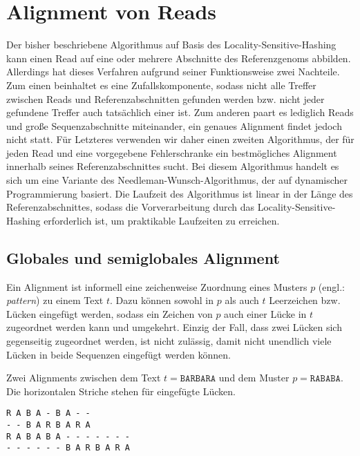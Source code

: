 \chapter{Alignment von Reads}
\label{sec:align}

Der bisher beschriebene Algorithmus auf Basis des Locality-Sensitive-Hashing kann einen Read auf eine oder mehrere Abschnitte des Referenzgenoms abbilden. Allerdings hat dieses Verfahren aufgrund seiner Funktionsweise zwei Nachteile. Zum einen beinhaltet es eine Zufallskomponente, sodass nicht alle Treffer zwischen Reads und Referenzabschnitten gefunden werden bzw. nicht jeder gefundene Treffer auch tatsächlich einer ist. Zum anderen paart es lediglich Reads und  große Sequenzabschnitte miteinander, ein genaues Alignment findet jedoch nicht statt. Für Letzteres verwenden wir daher einen zweiten Algorithmus, der für jeden Read und eine vorgegebene Fehlerschranke ein bestmögliches Alignment innerhalb seines Referenzabschnittes sucht. Bei diesem Algorithmus handelt es sich um eine Variante des Needleman-Wunsch-Algorithmus, der auf dynamischer Programmierung basiert. Die Laufzeit des Algorithmus ist linear in der Länge des Referenzabschnittes, sodass die Vorverarbeitung durch das Locality-Sensitive-Hashing erforderlich ist, um praktikable Laufzeiten zu erreichen.

\section{Globales und semiglobales Alignment}
\label{sec:align:basics}

Ein Alignment ist informell eine zeichenweise Zuordnung eines Musters $p$ (engl.: \textit{pattern}) zu einem Text $t$. Dazu können sowohl in  $p$ als auch $t$ Leerzeichen bzw. Lücken eingefügt werden, sodass ein Zeichen von $p$ auch einer Lücke in $t$ zugeordnet werden kann und umgekehrt. Einzig der Fall, dass zwei Lücken sich gegenseitig zugeordnet werden, ist nicht zulässig, damit nicht unendlich viele Lücken in beide Sequenzen eingefügt werden können.

\begin{beispiel}
\label{bsp:align:basics:alignment}
Zwei Alignments zwischen dem Text $t = \texttt{BARBARA}$ und dem Muster $p = \texttt{RABABA}$. Die horizontalen Striche stehen für eingefügte Lücken.

\begin{multicols}{2}
\texttt{R A B A - B A - -}\\
\texttt{- - B A R B A R A}\\

\texttt{R A B A B A - - - - - - -}\\
\texttt{- - - - - - B A R B A R A}\\
\end{multicols}
\end{beispiel}

